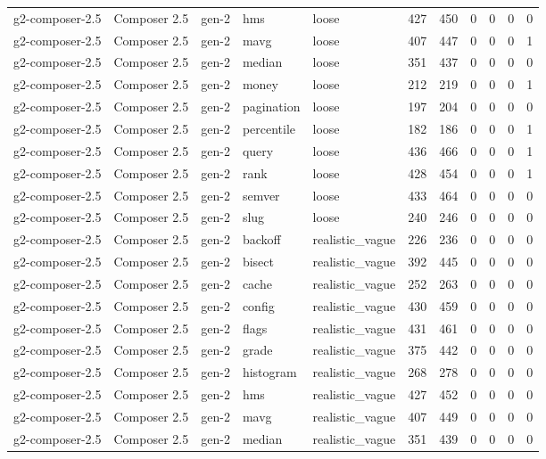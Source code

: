 \begin{tabular}{lllllllllll}
g2-composer-2.5 & Composer 2.5 & gen-2 & hms & loose & 427 & 450 & 0 & 0 & 0 & 0 \\
g2-composer-2.5 & Composer 2.5 & gen-2 & mavg & loose & 407 & 447 & 0 & 0 & 0 & 1 \\
g2-composer-2.5 & Composer 2.5 & gen-2 & median & loose & 351 & 437 & 0 & 0 & 0 & 0 \\
g2-composer-2.5 & Composer 2.5 & gen-2 & money & loose & 212 & 219 & 0 & 0 & 0 & 1 \\
g2-composer-2.5 & Composer 2.5 & gen-2 & pagination & loose & 197 & 204 & 0 & 0 & 0 & 0 \\
g2-composer-2.5 & Composer 2.5 & gen-2 & percentile & loose & 182 & 186 & 0 & 0 & 0 & 1 \\
g2-composer-2.5 & Composer 2.5 & gen-2 & query & loose & 436 & 466 & 0 & 0 & 0 & 1 \\
g2-composer-2.5 & Composer 2.5 & gen-2 & rank & loose & 428 & 454 & 0 & 0 & 0 & 1 \\
g2-composer-2.5 & Composer 2.5 & gen-2 & semver & loose & 433 & 464 & 0 & 0 & 0 & 0 \\
g2-composer-2.5 & Composer 2.5 & gen-2 & slug & loose & 240 & 246 & 0 & 0 & 0 & 0 \\
g2-composer-2.5 & Composer 2.5 & gen-2 & backoff & realistic\_vague & 226 & 236 & 0 & 0 & 0 & 0 \\
g2-composer-2.5 & Composer 2.5 & gen-2 & bisect & realistic\_vague & 392 & 445 & 0 & 0 & 0 & 0 \\
g2-composer-2.5 & Composer 2.5 & gen-2 & cache & realistic\_vague & 252 & 263 & 0 & 0 & 0 & 0 \\
g2-composer-2.5 & Composer 2.5 & gen-2 & config & realistic\_vague & 430 & 459 & 0 & 0 & 0 & 0 \\
g2-composer-2.5 & Composer 2.5 & gen-2 & flags & realistic\_vague & 431 & 461 & 0 & 0 & 0 & 0 \\
g2-composer-2.5 & Composer 2.5 & gen-2 & grade & realistic\_vague & 375 & 442 & 0 & 0 & 0 & 0 \\
g2-composer-2.5 & Composer 2.5 & gen-2 & histogram & realistic\_vague & 268 & 278 & 0 & 0 & 0 & 0 \\
g2-composer-2.5 & Composer 2.5 & gen-2 & hms & realistic\_vague & 427 & 452 & 0 & 0 & 0 & 0 \\
g2-composer-2.5 & Composer 2.5 & gen-2 & mavg & realistic\_vague & 407 & 449 & 0 & 0 & 0 & 0 \\
g2-composer-2.5 & Composer 2.5 & gen-2 & median & realistic\_vague & 351 & 439 & 0 & 0 & 0 & 0 \\

\end{tabular}
